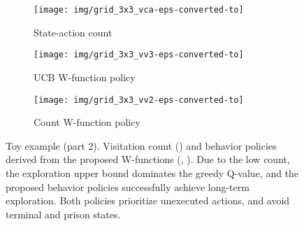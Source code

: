 \documentclass{article}
\begin{document}
\clearpage


\begin{figure}[t]
	\centering 
	\begin{subfigure}[t]{.325\linewidth} 
		\centering 
		\texttt{[image: img/grid\_3x3\_vca-eps-converted-to]}
		\caption{\label{fig:toy_vca2}State-action count}
	\end{subfigure}
	\hfill
	\begin{subfigure}[t]{.325\linewidth} 
		\centering 
		\texttt{[image: img/grid\_3x3\_vv3-eps-converted-to]}
		\caption{\label{fig:toy_vv3}UCB W-function policy} 
	\end{subfigure} 
	\hfill
	\begin{subfigure}[t]{.325\linewidth} 
		\centering 
		\texttt{[image: img/grid\_3x3\_vv2-eps-converted-to]}
		\caption{\label{fig:toy_vv2}Count W-function policy}
	\end{subfigure}
	\centering 
	\caption{\label{fig:toy_example_contd}Toy example (part 2). Visitation count () and behavior policies derived from the proposed W-functions (, ). Due to the low count, the exploration upper bound dominates the greedy Q-value, and the proposed behavior policies successfully achieve long-term exploration. Both policies prioritize unexecuted actions, and avoid terminal and prison states.}
\end{figure}
\end{document}
